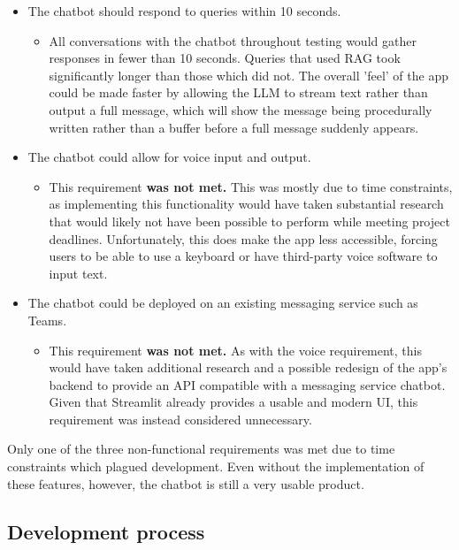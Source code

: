 \begin{itemize}
    \item The chatbot should respond to queries within 10 seconds.
    \begin{itemize}
        \item All conversations with the chatbot throughout testing would gather responses 
        in fewer than 10 seconds. Queries that used RAG took significantly longer than those which 
        did not. The overall 'feel' of the app could be made faster by allowing the LLM to stream 
        text rather than output a full message, which will show the message being procedurally written 
        rather than a buffer before a full message suddenly appears.
    \end{itemize}
    \item The chatbot could allow for voice input and output.
    \begin{itemize}
        \item This requirement \textbf{was not met.} This was mostly due to time constraints, as implementing this 
        functionality would have taken substantial research that would likely not have been possible to perform 
        while meeting project deadlines. Unfortunately, this does make the app less accessible, forcing users 
        to be able to use a keyboard or have third-party voice software to input text.
    \end{itemize}
    \item The chatbot could be deployed on an existing messaging service such as Teams.
    \begin{itemize}
        \item This requirement \textbf{was not met.} As with the voice requirement, this would have taken additional 
        research and a possible redesign of the app's backend to provide an API compatible with a messaging 
        service chatbot. Given that Streamlit already provides a usable and modern UI, this requirement was instead 
        considered unnecessary.
    \end{itemize}
\end{itemize}

\noindent Only one of the three non-functional requirements was met due to time constraints which plagued development.
Even without the implementation of these features, however, the chatbot is still a very usable product.

\subsection{Development process}\label{sec:EvalProcess}
